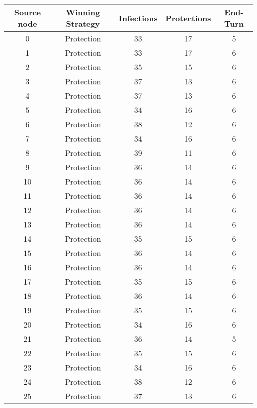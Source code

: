 \documentclass[results.tex]{subfiles}
\begin{document}
\begin{center}
  \begin{tabular}{| c || c | c | c | c |}
    \hline
    {\bfseries Source node} & {\bfseries Winning Strategy} & {\bfseries Infections} & {\bfseries Protections} & {\bfseries End-Turn} \\  %
    \hline\hline
    0 & Protection & 33 & 17 & 5 \\ 
    \hline
    1 & Protection & 33 & 17 & 6 \\ 
    \hline
    2 & Protection & 35 & 15 & 6 \\ 
    \hline
    3 & Protection & 37 & 13 & 6 \\ 
    \hline
    4 & Protection & 37 & 13 & 6 \\ 
    \hline
    5 & Protection & 34 & 16 & 6 \\ 
    \hline
    6 & Protection & 38 & 12 & 6 \\ 
    \hline
    7 & Protection & 34 & 16 & 6 \\ 
    \hline
    8 & Protection & 39 & 11 & 6 \\ 
    \hline
    9 & Protection & 36 & 14 & 6 \\ 
    \hline
    10 & Protection & 36 & 14 & 6 \\ 
    \hline
    11 & Protection & 36 & 14 & 6 \\ 
    \hline
    12 & Protection & 36 & 14 & 6 \\ 
    \hline
    13 & Protection & 36 & 14 & 6 \\ 
    \hline
    14 & Protection & 35 & 15 & 6 \\ 
    \hline
    15 & Protection & 36 & 14 & 6 \\ 
    \hline
    16 & Protection & 36 & 14 & 6 \\ 
    \hline
    17 & Protection & 35 & 15 & 6 \\ 
    \hline
    18 & Protection & 36 & 14 & 6 \\ 
    \hline
    19 & Protection & 35 & 15 & 6 \\ 
    \hline
    20 & Protection & 34 & 16 & 6 \\ 
    \hline
    21 & Protection & 36 & 14 & 5 \\ 
    \hline
    22 & Protection & 35 & 15 & 6 \\ 
    \hline
    23 & Protection & 34 & 16 & 6 \\ 
    \hline
    24 & Protection & 38 & 12 & 6 \\ 
    \hline
    25 & Protection & 37 & 13 & 6 \\ 

\end{tabular}
\end{center}
\end{document}
